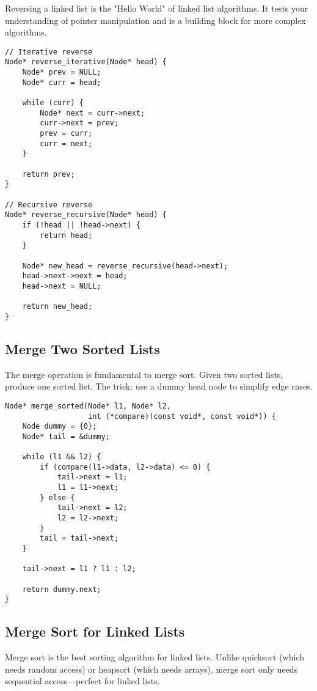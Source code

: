 Reversing a linked list is the "Hello World" of linked list algorithms. It tests your understanding of pointer manipulation and is a building block for more complex algorithms.

\begin{lstlisting}
// Iterative reverse
Node* reverse_iterative(Node* head) {
    Node* prev = NULL;
    Node* curr = head;

    while (curr) {
        Node* next = curr->next;
        curr->next = prev;
        prev = curr;
        curr = next;
    }

    return prev;
}

// Recursive reverse
Node* reverse_recursive(Node* head) {
    if (!head || !head->next) {
        return head;
    }

    Node* new_head = reverse_recursive(head->next);
    head->next->next = head;
    head->next = NULL;

    return new_head;
}
\end{lstlisting}

\subsection{Merge Two Sorted Lists}

The merge operation is fundamental to merge sort. Given two sorted lists, produce one sorted list. The trick: use a dummy head node to simplify edge cases.

\begin{lstlisting}
Node* merge_sorted(Node* l1, Node* l2,
                   int (*compare)(const void*, const void*)) {
    Node dummy = {0};
    Node* tail = &dummy;

    while (l1 && l2) {
        if (compare(l1->data, l2->data) <= 0) {
            tail->next = l1;
            l1 = l1->next;
        } else {
            tail->next = l2;
            l2 = l2->next;
        }
        tail = tail->next;
    }

    tail->next = l1 ? l1 : l2;

    return dummy.next;
}
\end{lstlisting}

\subsection{Merge Sort for Linked Lists}

Merge sort is the best sorting algorithm for linked lists. Unlike quicksort (which needs random access) or heapsort (which needs arrays), merge sort only needs sequential access---perfect for linked lists.

